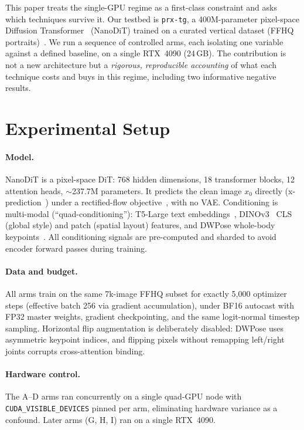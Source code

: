 \documentclass[10pt,twocolumn]{article}
\begin{document}
This paper treats the single-GPU regime as a first-class constraint and asks
which techniques survive it. Our testbed is \texttt{prx-tg}, a 400M-parameter
pixel-space Diffusion Transformer~\citep{peebles2023dit} (NanoDiT) trained on a curated vertical
dataset (FFHQ portraits)~\citep{karras2019ffhq}. We run a sequence of controlled arms, each isolating
one variable against a defined baseline, on a single RTX~4090 (24\,GB). The
contribution is not a new architecture but a \emph{rigorous, reproducible
accounting} of what each technique costs and buys in this regime, including two
informative negative results.

\section{Experimental Setup}
\label{sec:setup}

\paragraph{Model.} NanoDiT is a pixel-space DiT: 768 hidden dimensions, 18
transformer blocks, 12 attention heads, $\sim$237.7M parameters. It predicts the
clean image $x_0$ directly (x-prediction~\citep{li2025xprediction}) under a
rectified-flow objective~\citep{liu2023rectifiedflow,lipman2023flowmatching}, with
no VAE. Conditioning is multi-modal (``quad-conditioning''): T5-Large text
embeddings~\citep{raffel2020t5}, DINOv3~\citep{simeoni2025dinov3} CLS (global
style) and patch (spatial layout) features, and DWPose whole-body
keypoints~\citep{yang2023dwpose}. All conditioning signals are pre-computed and
sharded to avoid encoder forward passes during training.

\paragraph{Data and budget.} All arms train on the same 7k-image FFHQ subset for
exactly 5{,}000 optimizer steps (effective batch 256 via gradient accumulation),
under BF16 autocast with FP32 master weights, gradient checkpointing, and the
same logit-normal timestep sampling. Horizontal flip augmentation is
deliberately disabled: DWPose uses asymmetric keypoint indices, and flipping
pixels without remapping left/right joints corrupts cross-attention binding.

\paragraph{Hardware control.} The A--D arms ran concurrently on a single
quad-GPU node with \texttt{CUDA\_VISIBLE\_DEVICES} pinned per arm, eliminating
hardware variance as a confound. Later arms (G, H, I) ran on a single RTX~4090.
\end{document}
